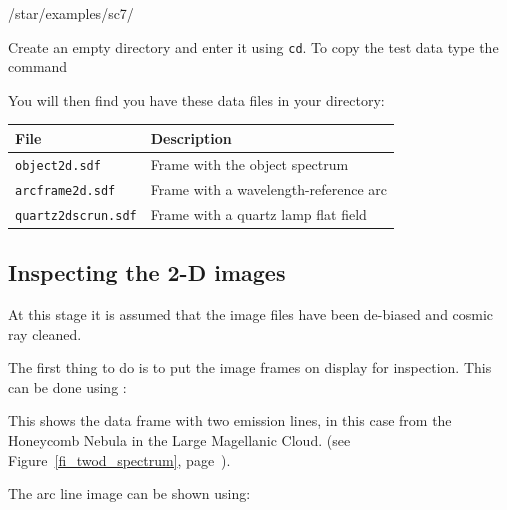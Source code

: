 \documentclass[twoside,11pt]{starlink}
\providecommand{\scspec}[2]{#1}
\begin{document}
{
\scspec{\small}{ }
\begin{terminalv}
   /star/examples/sc7/
\end{terminalv}
}

Create an empty directory and enter it using \verb+cd+\@.
To copy the test data type the command

{
\scspec{\small}{ }
\begin{terminalv}
\end{terminalv}
}

You will then find you have these data files in your directory:

\begin{center}
\begin{tabular}{ll}
File & Description \\ \hline
\texttt{object2d.sdf}  & Frame with the object spectrum\\
\texttt{arcframe2d.sdf}     & Frame with a wavelength-reference arc\\
\texttt{quartz2dscrun.sdf}    & Frame with a quartz lamp flat field\\
\end{tabular}
\end{center}

\subsection{Inspecting the 2-D images}

At this stage it is assumed that the image files have been de-biased and
cosmic ray cleaned.

The first thing to do is to put the image frames on display for inspection.
This can be done using 
:

{
\scspec{\small}{ }
\begin{terminalv}
\end{terminalv}
}

This shows the data frame with two emission lines, in this case from
the Honeycomb Nebula in the Large Magellanic Cloud.  (see
\scspec{Figure~\ref{fi_twod_spectrum},
page~\pageref{fi_twod_spectrum}}{The figure in the introduction}).

The arc line image can be shown using:

{
\scspec{\small}{ }
\begin{terminalv}
\end{terminalv}
}
\end{document}
